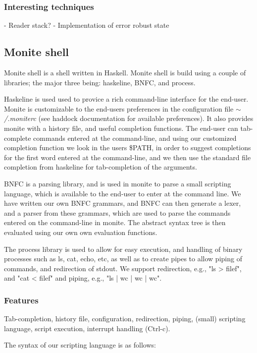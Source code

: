 \documentclass[11pt,a4paper]{article}
\begin{document}
\subsubsection{Interesting techniques}
- Reader stack?
- Implementation of error robust state

\subsection{Monite shell}
Monite shell is a shell written in Haskell. Monite shell is build using a couple
of libraries; the major three being: haskeline, BNFC, and process.

Haskeline is used used to provice a rich command-line interface for the
end-user. Monite is customizable to the end-users preferences in the
configuration file $\mathtt{\sim}$\textit{/.moniterc} (see haddock documentation
for available preferences). It also provides monite with a history file, and
useful completion functions. The end-user can tab-complete commands entered at
the command-line, and using our customized completion function we look in the
users \$PATH, in order to suggest completions for the first word entered at the
command-line, and we then use the standard file completion from haskeline for
tab-completion of the arguments.

BNFC is a parsing library, and is used in monite to parse a small scripting
language, which is available to the end-user to enter at the command line. We
have written our own BNFC grammars, and BNFC can then generate a lexer, and a
parser from these grammars, which are used to parse the commands entered on the
command-line in monite. The abstract syntax tree is then evaluated using our own
own evaluation functions.

The process library is used to allow for easy execution, and handling of binary
processes such as ls, cat, echo, etc, as well as to create pipes to allow
piping of commands, and redirection of stdout. We support redirection, e.g.,
"ls > filef", and "cat < filef" and piping, e.g., "ls | wc | wc | wc".

\subsubsection{Features}
Tab-completion, history file, configuration, redirection, piping, (small)
scripting language, script execution, interrupt handling (Ctrl-c).

The syntax of our scripting language is as follows:
\end{document}
